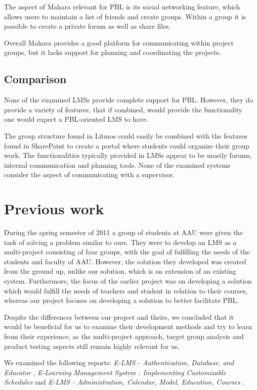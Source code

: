 The aspect of Mahara relevant for PBL is its social networking feature, which allows users to maintain a list of friends and create groups.
Within a group it is possible to create a private forum as well as share files.

Overall Mahara provides a good platform for communicating within project groups, but it lacks support for planning and coordinating the projects.

\subsection{Comparison}
None of the examined LMSs provide complete support for PBL.
However, they do provide a variety of features, that if combined, would provide the functionality one would expect a PBL-oriented LMS to have.

The group structure found in Litmos could easily be combined with the features found in SharePoint to create a portal where students could organize their group work.
The functionalities typically provided in LMSs appear to be mostly forums, internal communication and planning tools.
None of the examined systems consider the aspect of communicating with a supervisor.

\section{Previous work}
During the spring semester of 2011 a group of students at AAU were given the task of solving a problem similar to ours. 
They were to develop an LMS as a multi-project consisting of four groups, with the goal of fulfilling the needs of the students and faculty of AAU.
However, the solution they developed was created from the ground up, unlike our solution, which is an extension of an existing system.
Furthermore, the focus of the earlier project was on developing a solution which would fulfill the needs of teachers and student in relation to their courses, whereas our project focuses on developing a solution to better facilitate PBL. 

Despite the differences between our project and theirs, we concluded that it would be beneficial for us to examine their development methods and try to learn from their experience, as the multi-project approach, target group analysis and product testing aspects still remain highly relevant for us. 

We examined the following reports: \emph{E-LMS - Authentication, Database, and Educator} \cite{E-LMS-ADE},  \emph{E-Learning Management System : Implementing Customizable Schedules} \cite{E-LMS-ICS} and \emph{E-LMS - Administration, Calendar, Model, Education, Courses} \cite{E-LMS-ACMEC}.

